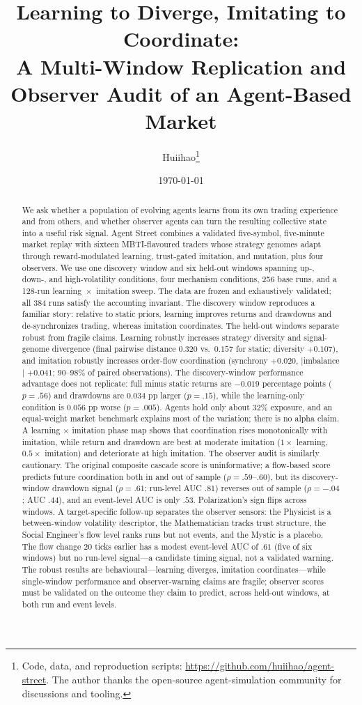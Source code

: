 \documentclass[11pt]{article}
\title{Learning to Diverge, Imitating to Coordinate:\\
A Multi-Window Replication and Observer Audit of an Agent-Based Market}
\author{Huiihao\thanks{Code, data, and reproduction scripts:
\url{https://github.com/huiihao/agent-street}. The author thanks the open-source
agent-simulation community for discussions and tooling.}}
\date{\today}
\begin{document}
\maketitle

\begin{abstract}
We ask whether a population of evolving agents learns from its own trading
experience and from others, and whether observer agents can turn the resulting
collective state into a useful risk signal. Agent Street combines a validated
five-symbol, five-minute market replay with sixteen MBTI-flavoured traders whose
strategy genomes adapt through reward-modulated learning, trust-gated imitation,
and mutation, plus four observers. We use one discovery window and six held-out
windows spanning up-, down-, and high-volatility conditions, four mechanism
conditions, 256 base runs, and a 128-run learning~$\times$~imitation sweep. The
data are frozen and exhaustively validated; all 384 runs satisfy the accounting
invariant. The discovery window reproduces a familiar story: relative to static
priors, learning improves returns and drawdowns and de-synchronizes trading,
whereas imitation coordinates. The held-out windows separate robust from fragile
claims. Learning robustly increases strategy diversity and signal-genome
divergence (final pairwise distance $0.320$ vs.\ $0.157$ for static; diversity
$+0.107$), and imitation robustly increases order-flow coordination (synchrony
$+0.020$, $|$imbalance$|$ $+0.041$; $90$--$98\%$ of paired observations). The
discovery-window performance advantage does not replicate: full minus static
returns are $-0.019$ percentage points ($p=.56$) and drawdowns are $0.034$ pp
larger ($p=.15$), while the learning-only condition is $0.056$ pp worse
($p=.005$). Agents hold only about $32\%$ exposure, and an equal-weight market
benchmark explains most of the variation; there is no alpha claim. A learning
$\times$ imitation phase map shows that coordination rises monotonically with
imitation, while return and drawdown are best at moderate imitation ($1\times$
learning, $0.5\times$ imitation) and deteriorate at high imitation. The observer
audit is similarly cautionary. The original composite cascade score is
uninformative; a flow-based score predicts future coordination both in and out of
sample ($\rho=.59$--$.60$), but its discovery-window drawdown signal
($\rho=.61$; run-level AUC $.81$) reverses out of sample ($\rho=-.04$; AUC
$.44$), and an event-level AUC is only $.53$. Polarization's sign flips across
windows. A target-specific follow-up separates the observer sensors: the
Physicist is a between-window volatility descriptor, the Mathematician tracks
trust structure, the Social Engineer's flow level ranks runs but not events, and
the Mystic is a placebo. The flow change 20 ticks earlier has a modest
event-level AUC of $.61$ (five of six windows) but no run-level signal---a
candidate timing signal, not a validated warning. The robust results are
behavioural---learning diverges, imitation coordinates---while single-window
performance and observer-warning claims are fragile; observer scores must be
validated on the outcome they claim to predict, across held-out windows, at both
run and event levels.
\end{abstract}
\end{document}
